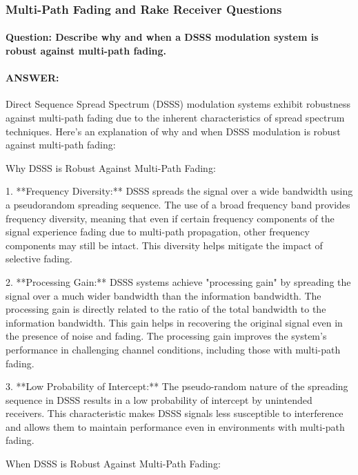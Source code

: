 \documentclass[colorlinks,11pt,a4paper,normalphoto,withhyper,ragged2e]{altareport}
\begin{document}
				
				
				
				
			\subsubsection{Multi-Path Fading and Rake Receiver Questions }
				\paragraph{Question: Describe why and when a DSSS modulation system is robust against multi-path fading.}
				\paragraph{ANSWER:}
				
				Direct Sequence Spread Spectrum (DSSS) modulation systems exhibit robustness against multi-path fading due to the inherent characteristics of spread spectrum techniques. Here's an explanation of why and when DSSS modulation is robust against multi-path fading:
				
				Why DSSS is Robust Against Multi-Path Fading:
				
				1. **Frequency Diversity:**
				DSSS spreads the signal over a wide bandwidth using a pseudorandom spreading sequence. The use of a broad frequency band provides frequency diversity, meaning that even if certain frequency components of the signal experience fading due to multi-path propagation, other frequency components may still be intact. This diversity helps mitigate the impact of selective fading.
				
				2. **Processing Gain:**
				DSSS systems achieve "processing gain" by spreading the signal over a much wider bandwidth than the information bandwidth. The processing gain is directly related to the ratio of the total bandwidth to the information bandwidth. This gain helps in recovering the original signal even in the presence of noise and fading. The processing gain improves the system's performance in challenging channel conditions, including those with multi-path fading.
				
				3. **Low Probability of Intercept:**
				The pseudo-random nature of the spreading sequence in DSSS results in a low probability of intercept by unintended receivers. This characteristic makes DSSS signals less susceptible to interference and allows them to maintain performance even in environments with multi-path fading.
				
				When DSSS is Robust Against Multi-Path Fading:
				
\end{document}
